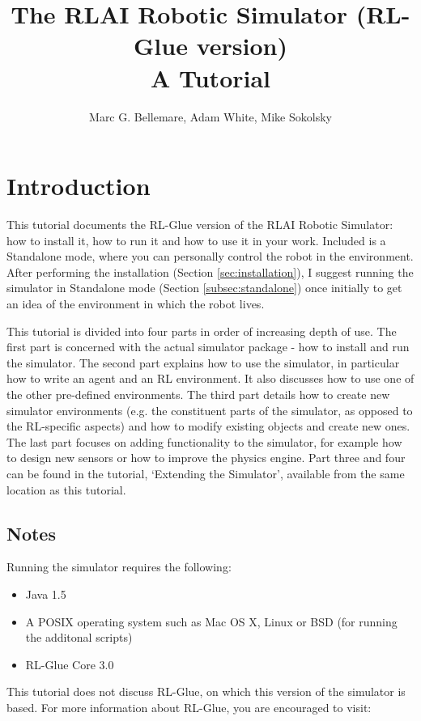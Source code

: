 \documentclass[12pt]{article}
\author{Marc G. Bellemare, Adam White, Mike Sokolsky}
\title{The RLAI Robotic Simulator (RL-Glue version)\\ A Tutorial}
\begin{document}
\maketitle

\tableofcontents

\section{Introduction}

This tutorial documents the RL-Glue version of the RLAI Robotic Simulator: how 
to install it, how to run it and how to use it in your work. Included is a 
Standalone mode, where you can personally control the robot in the environment.
After performing the installation (Section \ref{sec:installation}),  I suggest 
running the simulator in Standalone mode (Section \ref{subsec:standalone}) 
once initially to get an idea of the environment in which the robot lives.

This tutorial is divided into four parts in order of increasing depth of
use. The first part is concerned with the actual simulator package - how
to install and run the simulator. The second part explains how to use the 
simulator, in particular how to write an agent and an RL environment. It
also discusses how to use one of the other pre-defined environments. The
third part details how to create new simulator environments (e.g. the 
constituent parts of the simulator, as opposed to the RL-specific aspects)
and how to modify existing objects and create new ones. The last part focuses
on adding functionality to the simulator, for example how to design new 
sensors or how to improve the physics engine. Part three and four can be
found in the tutorial, `Extending the Simulator', available from the same
location as this tutorial.

\subsection{Notes}

Running the simulator requires the following:

\begin{itemize}
\item{Java 1.5}
\item{A POSIX operating system such as Mac OS X, Linux or BSD (for running the additonal scripts)}
\item{RL-Glue Core 3.0}
\end{itemize}

This tutorial does not discuss RL-Glue, on which this version of the simulator
is based. For more information about RL-Glue, you are encouraged to visit:
\end{document}
